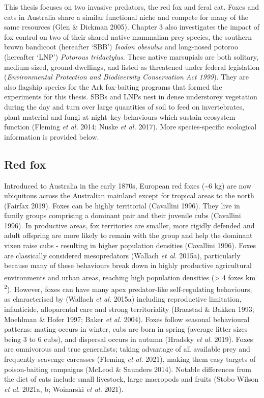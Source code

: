 \documentclass[11pt,a4paper,titlepage,twoside,openright]{style/unimelbthesis}
\begin{document}
\begin{mainmatter}
This thesis focuses on two invasive predators, the red fox and feral cat. Foxes and cats in Australia share a similar functional niche and compete for many of the same resources (Glen \& Dickman 2005). Chapter 3 also investigates the impact of fox control on two of their shared native mammalian prey species, the southern brown bandicoot (hereafter `SBB') \emph{Isodon obesulus} and long-nosed potoroo (hereafter `LNP') \emph{Potorous tridactylus}. These native marsupials are both solitary, medium-sized, ground-dwellings, and listed as threatened under federal legislation (\emph{Environmental Protection and Biodiversity Conservation Act 1999}). They are also flagship species for the Ark fox-baiting programs that formed the experiments for this thesis. SBBs and LNPs nest in dense understorey vegetation during the day and turn over large quantities of soil to feed on invertebrates, plant material and fungi at night--key behaviours which sustain ecosystem function (Fleming \emph{et al.} 2014; Nuske \emph{et al.} 2017). More species-specific ecological information is provided below.

\hypertarget{red-fox}{%
\subsection{Red fox}\label{red-fox}}

Introduced to Australia in the early 1870s, European red foxes (\textasciitilde6 kg) are now ubiquitous across the Australian mainland except for tropical areas to the north (Fairfax 2019). Foxes can be highly territorial (Cavallini 1996). They live in family groups comprising a dominant pair and their juvenile cubs (Cavallini 1996). In productive areas, fox territories are smaller, more rigidly defended and adult offspring are more likely to remain with the group and help the dominant vixen raise cubs - resulting in higher population densities (Cavallini 1996). Foxes are classically considered mesopredators (Wallach \emph{et al.} 2015a), particularly because many of these behaviours break down in highly productive agricultural environments and urban areas, reaching high population densities (\textgreater{} 4 foxes km\textsuperscript{-2}). However, foxes can have many apex predator-like self-regulating behaviours, as characterised by (Wallach \emph{et al.} 2015a) including reproductive limitation, infanticide, alloparental care and strong territoriality (Braastad \& Bakken 1993; Moehlman \& Hofer 1997; Baker \emph{et al.} 2004). Foxes follow seasonal behavioural patterns: mating occurs in winter, cubs are born in spring (average litter sizes being 3 to 6 cubs), and dispersal occurs in autumn (Hradsky \emph{et al.} 2019). Foxes are omnivorous and true generalists; taking advantage of all available prey and frequently scavenge carcasses (Fleming \emph{et al.} 2021), making them easy targets of poison-baiting campaigns (McLeod \& Saunders 2014). Notable differences from the diet of cats include small livestock, large macropods and fruits (Stobo-Wilson \emph{et al.} 2021a, b; Woinarski \emph{et al.} 2021).


\end{mainmatter}
\end{document}
